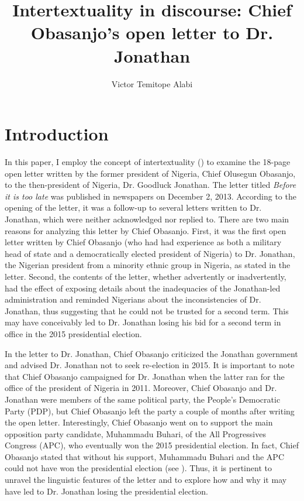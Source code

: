 \documentclass[output=paper,colorlinks,citecolor=brown]{langscibook}
\author{Victor Temitope Alabi\affiliation{Brown University}}
\title{Intertextuality in discourse: Chief Obasanjo’s open letter to Dr. Jonathan}
\begin{document}
\maketitle

\section{Introduction}
 
In this paper, I employ the concept of intertextuality (\citealt{Allen2011, Bakhtin1981, Kristeva1980}) to examine the 18-page open letter written by the former president of Nigeria, Chief Olusegun Obasanjo, to the then-president of Nigeria, Dr. Goodluck Jonathan. The letter titled \textit{Before it is too late} was published in newspapers on December 2, 2013. According to the opening of the letter, it was a follow-up to several letters written to Dr. Jonathan, which were neither acknowledged nor replied to. There are two main reasons for analyzing this letter by Chief Obasanjo. First, it was the first open letter written by Chief Obasanjo (who had had experience as both a military head of state and a democratically elected president of Nigeria) to Dr. Jonathan, the Nigerian president from a minority ethnic group in Nigeria, as stated in the letter. Second, the contents of the letter, whether advertently or inadvertently, had the effect of exposing details about the inadequacies of the Jonathan-led administration and reminded Nigerians about the inconsistencies of Dr. Jonathan, thus suggesting that he could not be trusted for a second term. This may have conceivably led to Dr. Jonathan losing his bid for a second term in office in the 2015 presidential election.

In the letter to Dr. Jonathan, Chief Obasanjo criticized the Jonathan government and advised Dr. Jonathan not to seek re-election in 2015. It is important to note that Chief Obasanjo campaigned for Dr. Jonathan when the latter ran for the office of the president of Nigeria in 2011. Moreover, Chief Obasanjo and Dr. Jonathan were members of the same political party, the People’s Democratic Party (PDP), but Chief Obasanjo left the party a couple of months after writing the open letter. Interestingly, Chief Obasanjo went on to support the main opposition party candidate, Muhammadu Buhari, of the All Progressives Congress (APC), who eventually won the 2015 presidential election. In fact, Chief Obasanjo stated that without his support, Muhammadu Buhari and the APC could not have won the presidential election (see \cite{Erezi2018}). Thus, it is pertinent to unravel the linguistic features of the letter and to explore how and why it may have led to Dr. Jonathan losing the presidential election. 
\end{document}

